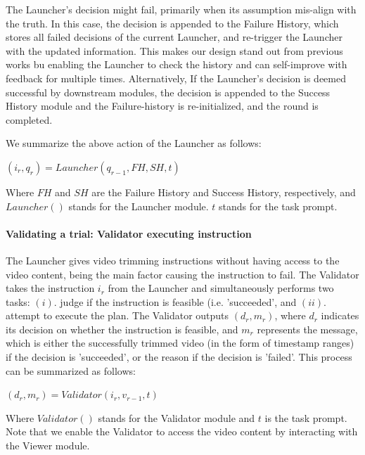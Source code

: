 The Launcher's decision might fail, primarily when its assumption mis-align with the truth. In this case, the decision is appended to the Failure History, which stores all failed decisions of the current Launcher, and re-trigger the Launcher with the updated information. This makes our design stand out from previous works \citep{VideoAgent, shang-etal-2024-traveler} bu enabling the Launcher to check the history and can self-improve with feedback for multiple times. Alternatively, If the Launcher's decision is deemed successful by downstream modules, the decision is appended to the Success History module and the Failure-history is re-initialized, and the round is completed. 


We summarize the above action of the Launcher as follows:
\begin{center}
$(i_{r}, q_{r}) = Launcher(q_{r-1}, FH, SH, t)$
\end{center}

Where $FH$ and $SH$ are the Failure History and Success History, respectively, and $Launcher()$ stands for the Launcher module. $t$ stands for the task prompt.




\paragraph{Validating a trial: Validator executing instruction}

The Launcher gives video trimming instructions without having access to the video content, being the main factor causing the instruction to fail. The Validator takes the instruction $i_{r}$ from the Launcher and simultaneously performs two tasks: $(i).$ judge if the instruction is feasible (i.e. 'succeeded', and $(ii).$ attempt to execute the plan. The Validator outputs $(d_{r}, m_{r})$, where $d_{r}$ indicates its decision on whether the instruction is feasible, and $m_{r}$ represents the message, which is either the successfully trimmed video (in the form of timestamp ranges) if the decision is 'succeeded', or the reason if the decision is 'failed'. This process can be summarized as follows:

\begin{center}
$(d_{r}, m_{r}) = Validator(i_{r}, v_{r-1}, t)$
\end{center}

Where $Validator()$ stands for the Validator module and $t$ is the task prompt. Note that we enable the Validator to access the video content by interacting with the Viewer module. 



